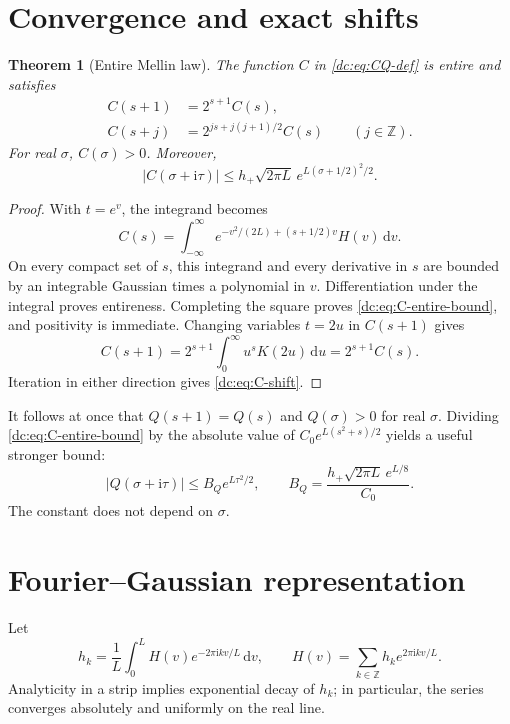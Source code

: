 \documentclass[11pt,a4paper,oneside,openany]{book}
\numberwithin{equation}{chapter}
\newtheorem{theorem}{Theorem}[chapter]
\theoremstyle{definition}
\theoremstyle{remark}
\newcommand{\Z}{\mathbb Z}
\newcommand{\dd}{\,\mathrm d}
\newcommand{\ii}{\mathrm i}
\newcommand{\abs}[1]{\left\lvert #1\right\rvert}
\begin{document}
\section{Convergence and exact shifts}
\begin{theorem}[Entire Mellin law]
\label{dc:thm:C-entire}
The function $C$ in \cref{dc:eq:CQ-def} is entire and satisfies
\begin{align}
 C(s+1)&=2^{s+1}C(s),\label{dc:eq:C-step}\\
 C(s+j)&=2^{js+j(j+1)/2}C(s)\qquad(j\in\Z).
 \label{dc:eq:C-shift}
\end{align}
For real $\sigma$, $C(\sigma)>0$. Moreover,
\begin{equation}
 \abs{C(\sigma+\ii\tau)}
 \le h_+\sqrt{2\pi L}\,
       e^{L(\sigma+1/2)^2/2}.
 \label{dc:eq:C-entire-bound}
\end{equation}
\end{theorem}
\begin{proof}
With $t=e^v$, the integrand becomes
\begin{equation}
 C(s)=\int_{-\infty}^\infty
 e^{-v^2/(2L)+(s+1/2)v}H(v)\dd v.
 \label{dc:eq:C-log-integral}
\end{equation}
On every compact set of $s$, this integrand and every derivative in
$s$ are bounded by an integrable Gaussian times a polynomial in $v$.
Differentiation under the integral proves entireness. Completing the
square proves \cref{dc:eq:C-entire-bound}, and positivity is immediate.
Changing variables $t=2u$ in $C(s+1)$ gives
\[
 C(s+1)=2^{s+1}\int_0^\infty u^sK(2u)\dd u
       =2^{s+1}C(s).
\]
Iteration in either direction gives \cref{dc:eq:C-shift}.
\end{proof}

It follows at once that $Q(s+1)=Q(s)$ and $Q(\sigma)>0$ for real
$\sigma$. Dividing \cref{dc:eq:C-entire-bound} by the absolute value of
$C_0e^{L(s^2+s)/2}$ yields a useful stronger bound:
\begin{equation}
 \abs{Q(\sigma+\ii\tau)}\le B_Qe^{L\tau^2/2},
 \qquad
 B_Q=\frac{h_+\sqrt{2\pi L}\,e^{L/8}}{C_0}.
 \label{dc:eq:Q-growth}
\end{equation}
The constant does not depend on $\sigma$.

\section{Fourier--Gaussian representation}
Let
\begin{equation}
 h_k=\frac1L\int_0^L H(v)e^{-2\pi\ii kv/L}\dd v,
 \qquad H(v)=\sum_{k\in\Z}h_ke^{2\pi\ii kv/L}.
 \label{dc:eq:H-Fourier}
\end{equation}
Analyticity in a strip implies exponential decay of $h_k$; in
particular, the series converges absolutely and uniformly on the
real line.
\end{document}
